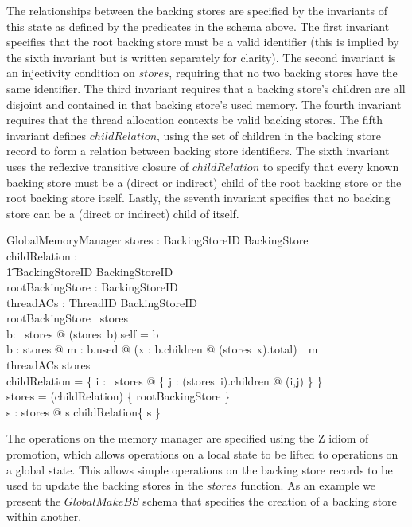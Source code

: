 \documentclass[a4paper,10pt]{report}
\begin{document}
The relationships between the backing stores are specified by the
invariants of this state as defined by the predicates in the schema
above.
The first invariant specifies that the root backing store must be a
valid identifier (this is implied by the sixth invariant but is
written separately for clarity).
The second invariant is an injectivity condition on $stores$,
requiring that no two backing stores have the same identifier.
The third invariant requires that a backing store's children are all
disjoint and contained in that backing store's used memory.
The fourth invariant requires that the thread allocation contexts be
valid backing stores.
The fifth invariant defines $childRelation$, using the set of children
in the backing store record to form a relation between backing store
identifiers.
The sixth invariant uses the reflexive transitive closure of
$childRelation$ to specify that every known backing store must be a
(direct or indirect) child of the root backing store or the root
backing store itself.
Lastly, the seventh invariant specifies that no backing store can be a
(direct or indirect) child of itself.
%
\begin{schema}{GlobalMemoryManager}
  stores : BackingStoreID \pfun BackingStore \\
  childRelation : \\
  \t1 BackingStoreID \rel BackingStoreID \\
  rootBackingStore : BackingStoreID \\
  threadACs : ThreadID \pfun BackingStoreID \\
  \where
  rootBackingStore \in \dom~stores \\
  \forall b: \dom~stores @ (stores~b).self = b \\
  \forall b : \ran stores @ \exists m : \power b.used @
  (\lambda x : b.children @ (stores~x).total)~\partition~m \\
  \ran threadACs \subseteq \dom stores \\
  childRelation = \bigcup \{ i : \dom~stores @ \{ j : (stores~i).children @ (i,j) \} \} \\
  \dom stores = (childRelation\star) \limg \{ rootBackingStore \} \rimg \\
  \forall s : \dom stores @ s \notin childRelation\plus \limg \{ s \} \rimg \\
\end{schema}
%
The operations on the memory manager are specified using the Z idiom
of promotion, which allows operations on a local state to be lifted to
operations on a global state.
This allows simple operations on the backing store records to be used
to update the backing stores in the $stores$ function.
As an example we present the $GlobalMakeBS$ schema that specifies the
creation of a backing store within another.
\end{document}
